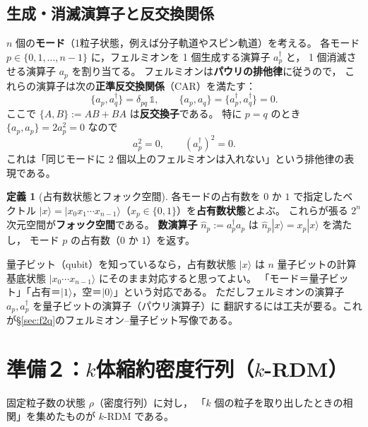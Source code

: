 \documentclass[11pt,a4paper]{ltjsarticle}
\newcommand{\ket}[1]{|#1\rangle}
\newcommand{\ad}{a^\dagger}
\newcommand{\Id}{\mathbb{1}}
\theoremstyle{definition}
\newtheorem{teigi}{定義}[section]
\theoremstyle{plain}
\begin{document}
\subsection{生成・消滅演算子と反交換関係}
$n$ 個の\textbf{モード}（1粒子状態，例えば分子軌道やスピン軌道）を考える。
各モード $p\in\{0,1,\dots,n-1\}$ に，フェルミオンを 1 個生成する演算子 $\ad_p$ と，
1 個消滅させる演算子 $a_p$ を割り当てる。
フェルミオンは\textbf{パウリの排他律}に従うので，
これらの演算子は次の\textbf{正準反交換関係}（CAR）を満たす：
\begin{equation}
  \{a_p,\ad_q\}=\delta_{pq}\,\Id,\qquad
  \{a_p,a_q\}=\{\ad_p,\ad_q\}=0 .
  \label{eq:CAR}
\end{equation}
ここで $\{A,B\}:=AB+BA$ は\textbf{反交換子}である。
特に $p=q$ のとき $\{a_p,a_p\}=2a_p^2=0$ なので
\begin{equation}
  a_p^2=0,\qquad (\ad_p)^2=0 .
  \label{eq:nilpotent}
\end{equation}
これは「同じモードに 2 個以上のフェルミオンは入れない」という排他律の表現である。

\begin{teigi}[占有数状態とフォック空間]
各モードの占有数を $0$ か $1$ で指定したベクトル
$\ket{x}=\ket{x_0 x_1\cdots x_{n-1}}$（$x_p\in\{0,1\}$）を\textbf{占有数状態}とよぶ。
これらが張る $2^n$ 次元空間が\textbf{フォック空間}である。
\textbf{数演算子} $\hat n_p:=\ad_p a_p$ は $\hat n_p\ket{x}=x_p\ket{x}$ を満たし，
モード $p$ の占有数（$0$ か $1$）を返す。
\end{teigi}

\begin{ideabox}
量子ビット（qubit）を知っているなら，占有数状態 $\ket{x}$ は
$n$ 量子ビットの計算基底状態 $\ket{x_0\cdots x_{n-1}}$ にそのまま対応すると思ってよい。
「モード＝量子ビット」「占有＝$\ket1$，空＝$\ket0$」という対応である。
ただしフェルミオンの演算子 $a_p,\ad_p$ を量子ビットの演算子（パウリ演算子）に
翻訳するには工夫が要る。これが\S\ref{sec:f2q}のフェルミオン--量子ビット写像である。
\end{ideabox}

\section{準備２：$k$体縮約密度行列（$k$-RDM）}\label{sec:rdm}

固定粒子数の状態 $\rho$（密度行列）に対し，
「$k$ 個の粒子を取り出したときの相関」を集めたものが $k$-RDM である。
\end{document}
